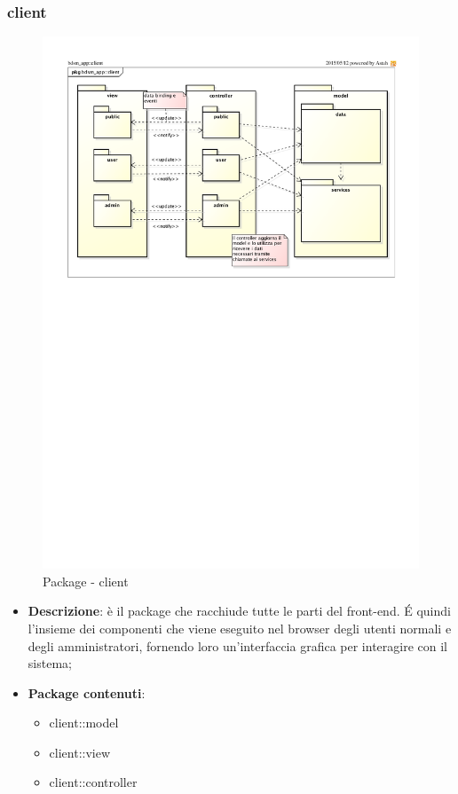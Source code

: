 	\subsubsection{client} %
	\label{ssub:bdsm_app_client}
	\begin{figure}[htbp]
		\centering
		\centerline{\includegraphics[scale=0.9]{./images/client/client.pdf}}
		\label{fig:package_client}
		\caption{Package - client}
	\end{figure}

	\begin{itemize}
		\item \textbf{Descrizione}: è il package che racchiude tutte le parti del front-end. \'E quindi l'insieme dei componenti che viene eseguito nel browser degli utenti normali e degli amministratori, fornendo loro un'interfaccia grafica per interagire con il sistema;
		\item \textbf{Package contenuti}:
			\begin{itemize}
				\item client::model
				\item client::view
				\item client::controller
			\end{itemize}
	\end{itemize}

